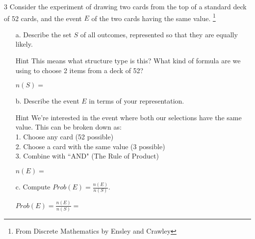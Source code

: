 \documentclass[a4paper,12pt]{book}
\newcounter{question}
\begin{document}
        \begin{question}{\thequestion}{3}
            Consider the experiment of drawing two cards from the top of
            a standard deck of 52 cards, and the event $E$ of the two cards
            having the same value.
            \footnote{From Discrete Mathematics by Ensley and Crawley}

            \begin{enumerate}
                \item[a.] Describe the set $S$ of all outcomes,
                    represented so that they are equally likely.

                    \begin{hint}{Hint}
                        This means what structure type is this? What
                        kind of formula are we using to choose 2 items
                        from a deck of 52?
                    \end{hint}
                    
                    $n(S) = $ 

                \item[b.] Describe the event $E$ in terms of your representation.
                
                    \begin{hint}{Hint}
                        We're interested in the event where both our selections
                        have the same value. This can be broken down as: \\
                        1. Choose any card (52 possible) \\
                        2. Choose a card with the same value (3 possible) \\
                        3. Combine with ``AND" (The Rule of Product)
                    \end{hint}
                    
                    $n(E) = $ 

                \item[c.] Compute $Prob(E) = \frac{n(E)}{n(S)}$.
                    
                    $Prob(E) = \frac{n(E)}{n(S)} =$
            \end{enumerate}

        \end{question}
\end{document}
